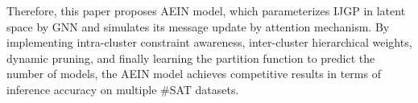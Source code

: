Therefore, this paper proposes AEIN model, which parameterizes IJGP in latent space by GNN and simulates its message 
update by attention mechanism. By implementing intra-cluster constraint awareness, inter-cluster hierarchical weights, 
dynamic pruning\cite{DBLP:conf/icip/LiCLCSQW23}\cite{DBLP:journals/nn/ZhangLWWW24}, and finally learning the partition 
function\cite{Bethe_1997_07}\cite{DBLP:journals/siamdm/ChandrasekaranCGSS11} to predict the number of models, the AEIN 
model achieves competitive results in terms of inference accuracy on multiple \#SAT datasets.
